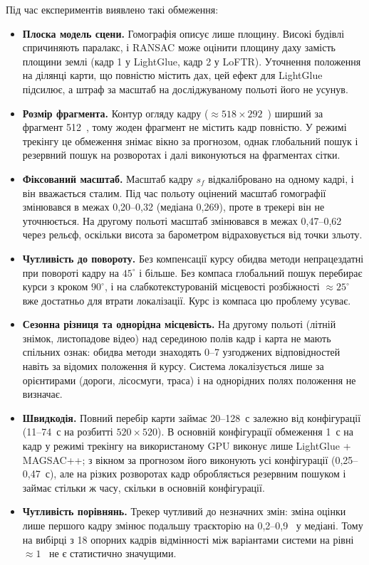 \documentclass[a4paper, 12pt, titlepage]{article}
\begin{document}
Під час експериментів виявлено такі обмеження:
\begin{itemize}
    \item \textbf{Плоска модель сцени.} Гомографія описує лише площину. Високі будівлі спричиняють паралакс, і RANSAC може оцінити площину даху замість площини землі (кадр 1 у LightGlue, кадр 2 у LoFTR). Уточнення положення на ділянці карти, що повністю містить дах, цей ефект для LightGlue підсилює, а штраф за масштаб на досліджуваному польоті його не усунув.
    \item \textbf{Розмір фрагмента.} Контур огляду кадру ($\approx 518 \times 292$~\px{}) ширший за фрагмент 512~\px{}, тому жоден фрагмент не містить кадр повністю. У режимі трекінгу це обмеження знімає вікно за прогнозом, однак глобальний пошук і резервний пошук на розворотах і далі виконуються на фрагментах сітки.
    \item \textbf{Фіксований масштаб.} Масштаб кадру $s_f$ відкалібровано на одному кадрі, і він вважається сталим. Під час польоту оцінений масштаб гомографії змінювався в межах 0,20--0,32 (медіана 0,269), проте в трекері він не уточнюється. На другому польоті масштаб змінювався в межах 0,47--0,62 через рельєф, оскільки висота за барометром відраховується від точки зльоту.
    \item \textbf{Чутливість до повороту.} Без компенсації курсу обидва методи непрацездатні при повороті кадру на $45^\circ$ і більше. Без компаса глобальний пошук перебирає курси з кроком $90^\circ$, і на слабкотекстурованій місцевості розбіжності $\approx 25^\circ$ вже достатньо для втрати локалізації. Курс із компаса цю проблему усуває.
    \item \textbf{Сезонна різниця та однорідна місцевість.} На другому польоті (літній знімок, листопадове відео) над серединою полів кадр і карта не мають спільних ознак: обидва методи знаходять 0--7 узгоджених відповідностей навіть за відомих положення й курсу. Система локалізується лише за орієнтирами (дороги, лісосмуги, траса) і на однорідних полях положення не визначає.
    \item \textbf{Швидкодія.} Повний перебір карти займає 20--128~с залежно від конфігурації (11--74~с на розбитті $520 \times 520$). В основній конфігурації обмеження 1~с на кадр у режимі трекінгу на використаному GPU виконує лише LightGlue + MAGSAC++; з вікном за прогнозом його виконують усі конфігурації (0,25--0,47~с), але на різких розворотах кадр обробляється резервним пошуком і займає стільки ж часу, скільки в основній конфігурації.
    \item \textbf{Чутливість порівнянь.} Трекер чутливий до незначних змін: зміна оцінки лише першого кадру змінює подальшу траєкторію на 0,2--0,9~\px{} у медіані. Тому на вибірці з 18 опорних кадрів відмінності між варіантами системи на рівні $\approx 1$~\px{} не є статистично значущими.

\end{itemize}
\end{document}
